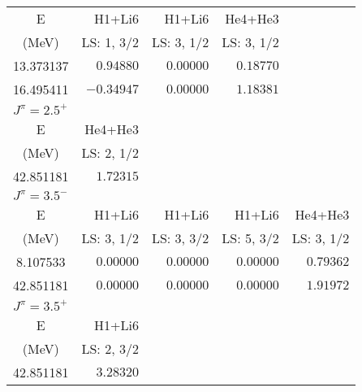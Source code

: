 \documentclass[aps]{revtex4}
\begin{document}
\begin{longtable}{c|rrrr}
E& H1+Li6 & H1+Li6 & He4+He3 \\ 
(MeV)& LS: 1, 3/2 & LS: 3, 1/2 & LS: 3, 1/2 \\ 
13.373137 & $0.94880$ & $0.00000$ & $0.18770$ \rule{0pt}{8pt}\\[1pt]
16.495411 & $-0.34947$ & $0.00000$ & $1.18381$ \rule{0pt}{8pt}\\[1pt]
\hline\multicolumn{5}{l}{\em $J^\pi = 2.5^+$ \rule{0pt}{7pt}}\\[1pt]\hline
E& He4+He3 \\ 
(MeV)& LS: 2, 1/2 \\ 
42.851181 & $1.72315$ \rule{0pt}{8pt}\\[1pt]
\hline\multicolumn{5}{l}{\em $J^\pi = 3.5^-$ \rule{0pt}{7pt}}\\[1pt]\hline
E& H1+Li6 & H1+Li6 & H1+Li6 & He4+He3 \\ 
(MeV)& LS: 3, 1/2 & LS: 3, 3/2 & LS: 5, 3/2 & LS: 3, 1/2 \\ 
8.107533 & $0.00000$ & $0.00000$ & $0.00000$ & $0.79362$ \rule{0pt}{8pt}\\[1pt]
42.851181 & $0.00000$ & $0.00000$ & $0.00000$ & $1.91972$ \rule{0pt}{8pt}\\[1pt]
\hline\multicolumn{5}{l}{\em $J^\pi = 3.5^+$ \rule{0pt}{7pt}}\\[1pt]\hline
E& H1+Li6 \\ 
(MeV)& LS: 2, 3/2 \\ 
42.851181 & $3.28320$ \rule{0pt}{8pt}\\[1pt]
\end{longtable}
\end{document}
